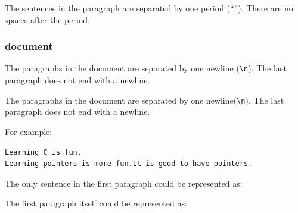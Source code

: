 The sentences in the paragraph are separated by one period (``.'').
There are no spaces after the period.

\subsubsection{document}\label{lab-exercise-1-structuring-the-document.md__document}

\begin{Shaded}
\begin{Highlighting}[]
\OperatorTok{\{}
    \OperatorTok{*}\OperatorTok{;}
    \OperatorTok{;}
\OperatorTok{\};}
\end{Highlighting}
\end{Shaded}

The paragraphs in the document are separated by one newline
(\texttt{\textbackslash{}n}). The last paragraph does not end with a
newline.

The paragraphs in the document are separated by one
newline(\texttt{\textbackslash{}n}). The last paragraph does not end
with a newline.

For example:

\begin{verbatim}
Learning C is fun. 
Learning pointers is more fun.It is good to have pointers.
\end{verbatim}

The only sentence in the first paragraph could be represented as:

\begin{Shaded}
\begin{Highlighting}[]
\OperatorTok{;}

\OperatorTok{=} \OperatorTok{\{}\OperatorTok{,} \OperatorTok{,} \OperatorTok{,} \OperatorTok{\};}
\end{Highlighting}
\end{Shaded}

The first paragraph itself could be represented as:

\begin{Shaded}
\begin{Highlighting}[]
\OperatorTok{;}

\OperatorTok{=} \OperatorTok{\{\{}\OperatorTok{,} \OperatorTok{,} \OperatorTok{,} \OperatorTok{\}\};}
\end{Highlighting}
\end{Shaded}

